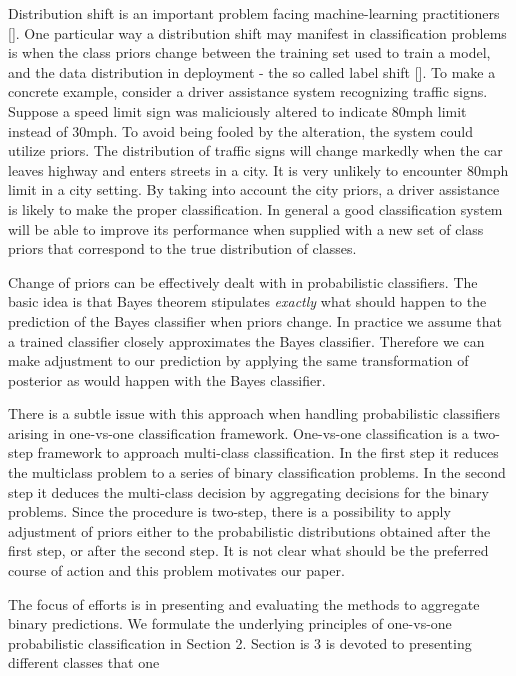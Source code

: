 \documentclass[twoside,11pt]{article}
\begin{document}
Distribution shift is an important problem facing machine-learning practitioners  [\cite{zhang2023dive, sugiyama2007covariate}].  One particular way a distribution shift may manifest in classification problems  is when the class priors change between the training set used to train a model, and the data distribution in deployment - the so called label shift [\cite{vsipka2022hitchhiker,lipton2018detecting}]. To make a concrete example, consider a driver assistance system recognizing traffic signs. Suppose a speed limit sign was maliciously altered to indicate 80mph limit instead of 30mph. To avoid being fooled by the alteration, the system could utilize priors. The distribution of traffic signs will change markedly when the car leaves highway and enters streets in a city. It is very unlikely to encounter 80mph limit in a city setting. By taking into account the city priors, a driver assistance is likely to make the proper classification. In general a good classification system will be able to improve its performance when supplied with a new set of class priors that correspond to the true distribution of classes. 

Change of priors can be effectively dealt with in probabilistic classifiers. The basic idea is that Bayes theorem stipulates \emph{exactly} what should happen  to the prediction of the  Bayes classifier when priors change.  In practice we assume that a trained classifier closely approximates the Bayes classifier. Therefore we can make adjustment to our prediction by applying the same transformation of posterior as would happen with the Bayes classifier. 

There is a subtle issue with this approach  when handling probabilistic classifiers arising in one-vs-one classification framework.   One-vs-one classification is a two-step framework to approach  multi-class classification. In the first step it reduces the multiclass problem to a series of binary classification problems. In the second step it deduces the multi-class decision by aggregating decisions for the binary problems. Since the procedure is two-step, there is a possibility to apply adjustment of priors either to the probabilistic distributions obtained after the first step, or after the second step. It is not clear what should be the preferred course of action and this problem motivates our paper.

The focus of efforts is in presenting and evaluating the methods to aggregate binary predictions. We formulate the underlying principles of one-vs-one probabilistic classification in Section 2. Section is 3 is devoted to presenting different classes that one 
\end{document}
